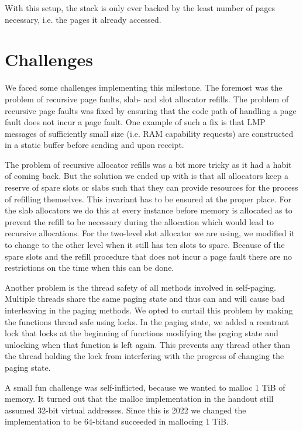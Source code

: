 With this setup, the stack is only ever backed by the least number of pages necessary, i.e. the pages
it already accessed.

\section{Challenges}
We faced some challenges implementing this milestone. The foremost was the problem of recursive
page faults, slab- and slot allocator refills. The problem of recursive page faults was fixed by
ensuring that the code path of handling a page fault does not incur a page fault. One example of such
a fix is that LMP messages of sufficiently small size (i.e. RAM capability requests) are constructed
in a static buffer before sending and upon receipt.

The problem of recursive allocator refills was a bit more tricky as it had a habit of coming back.
But the solution we ended up with is that all allocators keep a reserve of spare slots or slabs
such that they can provide resources for the process of refilling themselves. This invariant has to
be ensured at the proper place. For the slab allocators we do this at every instance before memory is allocated as to prevent 
the refill to be necessary during the allocation which would lead to recursive allocations. For the
two-level slot allocator we are using, we modified it to change to the other level when it still has
ten slots to spare. Because of the spare slots and the refill procedure that does not incur a page fault
there are no restrictions on the time when this can be done.

Another problem is the thread safety of all methods involved in self-paging. Multiple threads share
the same paging state and thus can and will cause bad interleaving in the paging methods. We opted
to curtail this problem by making the functions thread safe using locks. In the paging state, we added
a reentrant lock that locks at the beginning of functions modifying the paging state and unlocking
when that function is left again. This prevents any thread other than the thread holding the lock
from interfering with the progress of changing the paging state.

A small fun challenge was self-inflicted, because we wanted to malloc 1 TiB of memory. It turned
out that the malloc implementation in the handout still assumed 32-bit virtual addresses. Since
this is 2022 we changed the implementation to be 64-bitand succeeded in mallocing 1 TiB.

